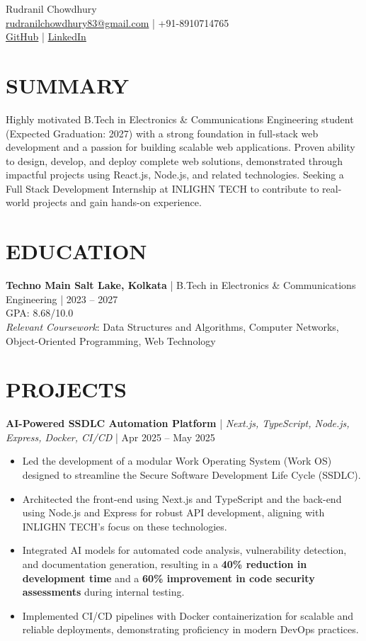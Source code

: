 \documentclass{article}
\begin{document}
\begin{center}
{\Large Rudranil Chowdhury} \\
\href{mailto:rudranilchowdhury83@gmail.com}{rudranilchowdhury83@gmail.com} | +91-8910714765 \\
\href{[GitHub Link]}{GitHub} | \href{ [LinkedIn Link]}{LinkedIn}
\end{center}

\section*{SUMMARY}

Highly motivated B.Tech in Electronics \& Communications Engineering student (Expected Graduation: 2027) with a strong foundation in full-stack web development and a passion for building scalable web applications. Proven ability to design, develop, and deploy complete web solutions, demonstrated through impactful projects using React.js, Node.js, and related technologies. Seeking a Full Stack Development Internship at INLIGHN TECH to contribute to real-world projects and gain hands-on experience.

\section*{EDUCATION}

\textbf{Techno Main Salt Lake, Kolkata} | B.Tech in Electronics \& Communications Engineering | 2023 – 2027 \\
GPA: 8.68/10.0 \\
\textit{Relevant Coursework}: Data Structures and Algorithms, Computer Networks, Object-Oriented Programming, Web Technology

\section*{PROJECTS}

\textbf{AI-Powered SSDLC Automation Platform} | \textit{Next.js, TypeScript, Node.js, Express, Docker, CI/CD} | Apr 2025 – May 2025
\begin{itemize}[leftmargin=*]
    \item Led the development of a modular Work Operating System (Work OS) designed to streamline the Secure Software Development Life Cycle (SSDLC).
    \item Architected the front-end using Next.js and TypeScript and the back-end using Node.js and Express for robust API development, aligning with INLIGHN TECH's focus on these technologies.
    \item Integrated AI models for automated code analysis, vulnerability detection, and documentation generation, resulting in a \textbf{40\% reduction in development time} and a \textbf{60\% improvement in code security assessments} during internal testing.
    \item Implemented CI/CD pipelines with Docker containerization for scalable and reliable deployments, demonstrating proficiency in modern DevOps practices.
\end{itemize}
\end{document}
